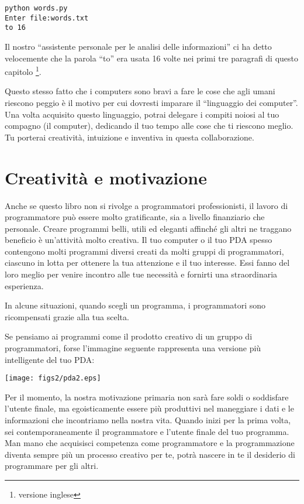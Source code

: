 \beforeverb
\begin{verbatim}
python words.py
Enter file:words.txt
to 16
\end{verbatim}
\afterverb
%
Il nostro {``}assistente personale per le analisi delle informazioni'' ci ha detto velocemente che la parola {``}to'' era usata 16 volte nei primi tre paragrafi di questo capitolo \footnote{versione inglese}.


Questo stesso fatto che i computers sono bravi a fare le cose che agli umani riescono peggio \`{e} il motivo per cui dovresti imparare il {``}linguaggio dei computer''. Una volta acquisito questo linguaggio, potrai delegare i compiti noiosi al tuo compagno (il computer), dedicando il tuo tempo alle cose che ti riescono meglio. Tu porterai creativit\`{a}, intuizione e inventiva in questa collaborazione.

\section{Creativit\`{a} e motivazione}

Anche se questo libro non si rivolge a programmatori professionisti, il lavoro di programmatore pu\`{o} essere molto gratificante, sia a livello finanziario che personale. Creare programmi belli, utili ed eleganti affinch\'{e} gli altri ne traggano beneficio \`{e} un'attivit\`{a} molto creativa. Il tuo computer o il tuo PDA spesso contengono molti programmi diversi creati da molti gruppi di programmatori, ciascuno in lotta per ottenere la tua attenzione e il tuo interesse. Essi fanno del loro meglio per venire incontro alle tue necessit\`{a} e fornirti una straordinaria esperienza. 


In alcune situazioni, quando scegli un programma, i programmatori sono ricompensati grazie alla tua scelta.


Se pensiamo ai programmi come il prodotto creativo di un gruppo di programmatori, forse l'immagine seguente rappresenta una versione pi\`{u} intelligente del tuo PDA:


\beforefig
\centerline{\texttt{[image: figs2/pda2.eps]}}
\afterfig

Per il momento, la nostra motivazione primaria non sar\`{a} fare soldi o soddisfare l'utente finale, ma egoisticamente essere pi\`{u} produttivi nel maneggiare i dati e le informazioni che incontriamo nella nostra vita. Quando inizi per la prima volta, sei contemporaneamente il programmatore e l'utente finale del tuo programma. Man mano che acquisisci competenza come programmatore e la programmazione diventa sempre pi\`{u} un processo creativo per te, potr\`{a} nascere in te il desiderio di programmare per gli altri.

